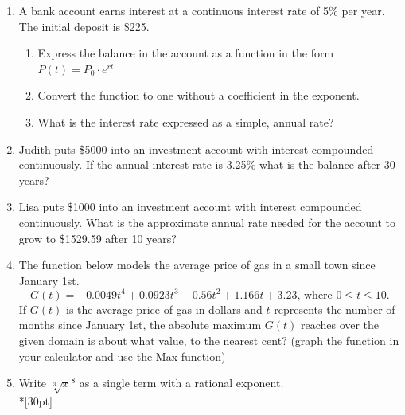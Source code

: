 \documentclass[12pt, oneside]{article}
\begin{document}


\begin{enumerate}


\item A bank account earns interest at a continuous interest rate of 5\% per year. The initial deposit is \$225.
\begin{enumerate}
    \item Express the balance in the account as a function in the form $P(t)=P_0 \cdot e^{rt}$\\[30pt]
    \item Convert the function to one without a coefficient in the exponent. \\[30pt]
    \item What is the interest rate expressed as a simple, annual rate?\\[30pt]
\end{enumerate}

\item Judith puts \$5000 into an investment account with interest compounded continuously. If the annual interest rate is 3.25\% what is the balance after 30 years?\\[60pt]

\item Lisa puts \$1000 into an investment account with interest compounded continuously. What is the approximate annual rate needed for the account to grow to \$1529.59 after 10 years?\\[60pt]


\item The function below models the average price of gas in a small town since January 1st.
\[G(t)=-0.0049t^4 + 0.0923t^3 - 0.56t^2 +1.166t+3.23 \text{, where } 0 \leq t \leq 10.\]
If $G(t)$ is the average price of gas in dollars and $t$ represents the number of months since January 1st, the absolute maximum $G(t)$ reaches over the given domain is about what value, to the nearest cent? (graph the function in your calculator and use the Max function)%

\newpage


\item Write $\sqrt[3]x^8$ as a single term with a rational exponent.\\*[30pt]


\end{enumerate}
\end{document}
